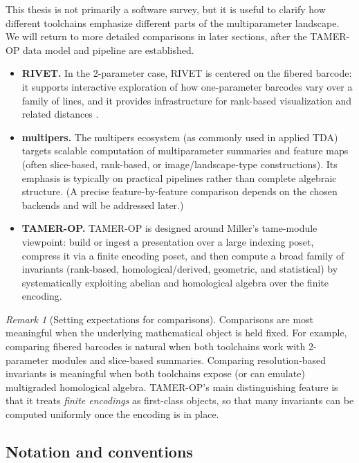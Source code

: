 \documentclass{article}
\newcommand{\<}{\langle}
\renewcommand{\>}{\rangle}
\theoremstyle{definition}
\theoremstyle{remark}
\newtheorem*{remark}{Remark}
\begin{document}
	This thesis is not primarily a software survey, but it is useful to clarify how
	different toolchains emphasize different parts of the multiparameter landscape.
	We will return to more detailed comparisons in later sections, after the TAMER-OP data
	model and pipeline are established.
	
	\begin{itemize}
		\item \textbf{RIVET.} In the 2-parameter case, RIVET is centered on the fibered
		barcode: it supports interactive exploration of how one-parameter barcodes vary over
		a family of lines, and it provides infrastructure for rank-based visualization and
		related distances \cite{RIVET}.
		
		\item \textbf{multipers.} The multipers ecosystem (as commonly used in applied TDA)
		targets scalable computation of multiparameter summaries and feature maps (often
		slice-based, rank-based, or image/landscape-type constructions).  Its emphasis is
		typically on practical pipelines rather than complete algebraic structure.  (A precise
		feature-by-feature comparison depends on the chosen backends and will be addressed
		later.)
		
		\item \textbf{TAMER-OP.} TAMER-OP is designed around Miller's tame-module viewpoint:
		build or ingest a presentation over a large indexing poset, compress it via a finite
		encoding poset, and then compute a broad family of invariants (rank-based,
		homological/derived, geometric, and statistical) by systematically exploiting abelian
		and homological algebra over the finite encoding.
	\end{itemize}
	
	\begin{remark}[Setting expectations for comparisons]\label{rmk:comparison-expectations}
		Comparisons are most meaningful when the underlying mathematical object is held fixed.
		For example, comparing fibered barcodes is natural when both toolchains work with
		2-parameter modules and slice-based summaries.  Comparing resolution-based invariants
		is meaningful when both toolchains expose (or can emulate) multigraded homological
		algebra.  TAMER-OP's main distinguishing feature is that it treats \emph{finite encodings}
		as first-class objects, so that many invariants can be computed uniformly once the
		encoding is in place.
	\end{remark}
	
	\subsection{Notation and conventions}\label{sec:background:conventions}
	
\end{document}
